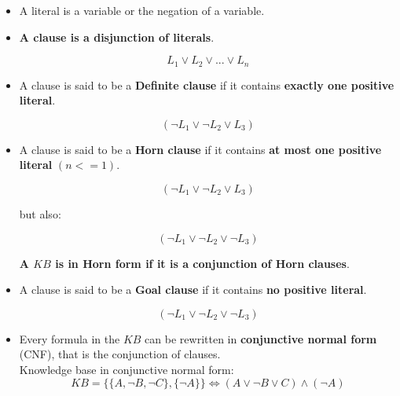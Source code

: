\documentclass{article}
\begin{document}
\begin{itemize}

    \item A literal is a variable or the negation of a variable.

    \item \textbf{A clause is a disjunction of literals}.

    \begin{equation*}
        L_1 \lor L_2 \lor ... \lor L_n
    \end{equation*}

    \item A clause is said to be a \textbf{Definite clause} if it contains \textbf{exactly one positive literal}.

    \begin{equation*}
        (\neg L_1 \lor \neg L_2 \lor L_3)
    \end{equation*}
        
    \item A clause is said to be a \textbf{Horn clause} if it contains \textbf{at most one positive literal} $(n <= 1)$.

    \begin{equation*}
        (\neg L_1 \lor \neg L_2 \lor L_3)
    \end{equation*}

    but also:

    \begin{equation*}
        (\neg L_1 \lor \neg L_2 \lor \neg L_3)
    \end{equation*}    

    \textbf{A $KB$ is in Horn form if it is a conjunction of Horn clauses}.

    \item A clause is said to be a \textbf{Goal clause} if it contains \textbf{no positive literal}.

    \begin{equation*}
        (\neg L_1 \lor \neg L_2 \lor \neg L_3)
    \end{equation*}

    \item Every formula in the $KB$ can be rewritten in \textbf{conjunctive normal form} (CNF), that is the conjunction of clauses. \\
    
    Knowledge base in conjunctive normal form:
    \begin{equation*}
        KB = \{\{A, \neg B, \neg C\}, \{\neg A\}\} \iff (A \lor \neg B \lor C) \land (\neg A)
    \end{equation*}


\end{itemize}
\end{document}
